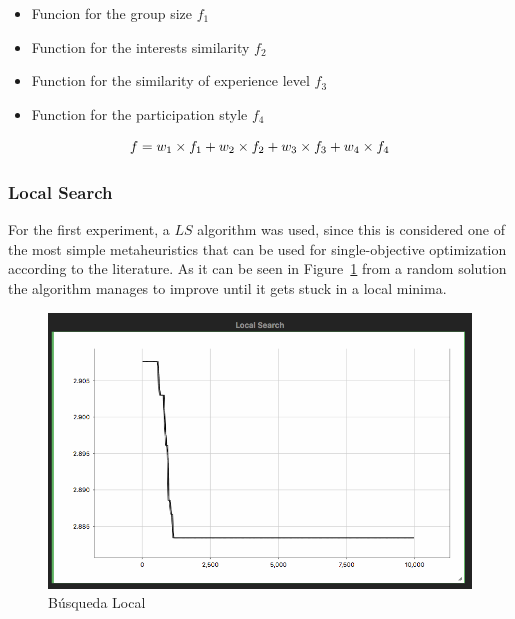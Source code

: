 \begin{itemize}
\item Funcion for the group size \(f_{1}\)
\item Function for the interests similarity \(f_{2}\)
\item Function for the similarity of experience level \(f_{3}\)
\item Function for the participation style \(f_{4}\)
\end{itemize}

\begin{equation} \label{weighted_function}
    f = w_{1} \times f_{1} + \\
    w_{2} \times f_{2} + \\
    w_{3} \times f_{3} + \\
    w_{4} \times f_{4}
\end{equation}

\subsubsection{Local Search}

For the first experiment, a $LS$ algorithm was used, since this is considered one of the most simple metaheuristics that can be used for single-objective optimization according to the literature. As it can be seen in Figure~\ref{fig:local_search} from a random solution the algorithm manages to improve until it gets stuck in a local minima.

\begin{figure}
    \centering
    \includegraphics[width=\textwidth]{Local.png}
    \caption{Búsqueda Local}
    \label{fig:local_search}
\end{figure}

